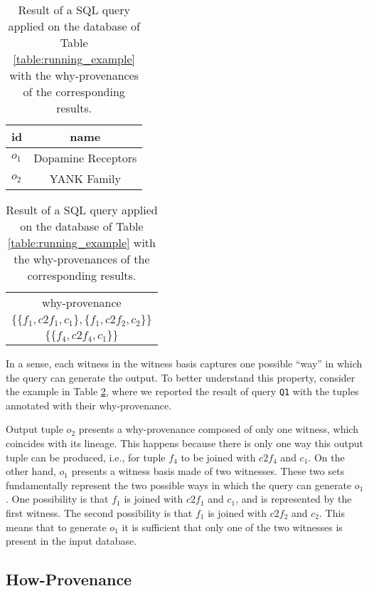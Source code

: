 \begin{table}[hbt]
\centering
  \begin{tabular}{|l|c|}
  \hline
    id & name\\
    \hline
    $o_1$ &  Dopamine Receptors\\
    $o_2$ & YANK Family\\
    \hline
  \end{tabular}
  \begin{tabular}{c}
  	why-provenance   \\
  	$\{\{f_1, c2f_1, c_1\}, \{f_1, c2f_2, c_2\}\}$ \\
  	$\{\{ f_4, c2f_4, c_1\}\}$ \\
  \end{tabular}
    \caption{Result of a SQL query applied on the database of Table \ref{table:running_example} with the why-provenances of the corresponding results.}
  \label{table:result_why_prov}
\end{table}
 
In a sense, each witness in the witness basis captures one possible ``way'' in which the query can generate the output. 
To better understand this property, consider the example in Table \ref{table:result_why_prov}, where we reported the result of query \texttt{Q1} with the tuples annotated with their why-provenance. 

Output tuple $o_2$ presents a why-provenance composed of only one witness, which coincides with its lineage. This happens because there is only one way this output tuple can be produced, i.e., for tuple $f_4$ to be joined with $c2f_4$ and $c_1$.
On the other hand, $o_1$ presents a witness basis made of two witnesses. 
These two sets fundamentally represent the two possible ways in which the query can generate $o_1$. 
One possibility is that $f_1$ is joined with $c2f_1$ and $c_1$, and is represented by the first witness. The second possibility is that $f_1$ is joined with $c2f_2$ and $c_2$. This means that to generate $o_1$ it is sufficient that only one of the two witnesses is present in the input database. 

\subsection{How-Provenance}
\label{section:how_provenance_tuples}

